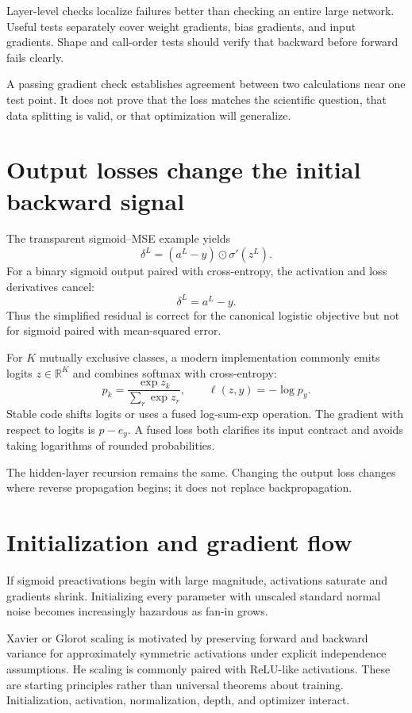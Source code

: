 Layer-level checks localize failures better than checking an entire large
network. Useful tests separately cover weight gradients, bias gradients, and
input gradients. Shape and call-order tests should verify that backward before
forward fails clearly.

\begin{warningbox}
A passing gradient check establishes agreement between two calculations near
one test point. It does not prove that the loss matches the scientific question,
that data splitting is valid, or that optimization will generalize.
\end{warningbox}

\section{Output losses change the initial backward signal}

The transparent sigmoid--MSE example yields
\[
  \delta^L=(a^L-y)\odot\sigma'(z^L).
\]
For a binary sigmoid output paired with cross-entropy, the activation and loss
derivatives cancel:
\[
  \delta^L=a^L-y.
\]
Thus the simplified residual is correct for the canonical logistic objective
but not for sigmoid paired with mean-squared error.

For $K$ mutually exclusive classes, a modern implementation commonly emits
logits $z\in\mathbb R^K$ and combines softmax with cross-entropy:
\[
  p_k=\frac{\exp z_k}{\sum_r\exp z_r},
  \qquad
  \ell(z,y)=-\log p_y.
\]
Stable code shifts logits or uses a fused log-sum-exp operation. The gradient
with respect to logits is $p-e_y$. A fused loss both clarifies its input
contract and avoids taking logarithms of rounded probabilities.

The hidden-layer recursion remains the same. Changing the output loss changes
where reverse propagation begins; it does not replace backpropagation.

\section{Initialization and gradient flow}

If sigmoid preactivations begin with large magnitude, activations saturate and
gradients shrink. Initializing every parameter with unscaled standard normal
noise becomes increasingly hazardous as fan-in grows.

Xavier or Glorot scaling is motivated by preserving forward and backward
variance for approximately symmetric activations under explicit independence
assumptions. He scaling is commonly paired with ReLU-like activations. These
are starting principles rather than universal theorems about training.
Initialization, activation, normalization, depth, and optimizer interact.

